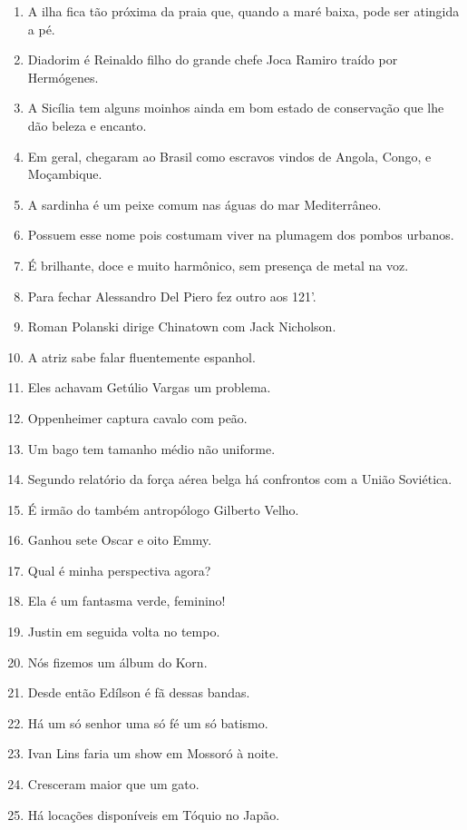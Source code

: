 \begin{enumerate}
\item A ilha fica t\~ao pr\'oxima da praia que, quando a mar\'e baixa, pode ser atingida a p\'e.
\item Diadorim \'e Reinaldo filho do grande chefe Joca Ramiro tra\'ido por Herm\'ogenes.
\item A Sic\'ilia tem alguns moinhos ainda em bom estado de conserva\c{c}\~ao que lhe d\~ao beleza e encanto.
\item Em geral, chegaram ao Brasil como escravos vindos de Angola, Congo, e Mo\c{c}ambique.
\item A sardinha \'e um peixe comum nas \'aguas do mar Mediterr\^aneo.
\item Possuem esse nome pois costumam viver na plumagem dos pombos urbanos.
\item \'E brilhante, doce e muito harm\^onico, sem presen\c{c}a de metal na voz.
\item Para fechar Alessandro Del Piero fez outro aos 121'.
\item Roman Polanski dirige Chinatown com Jack Nicholson.
\item A atriz sabe falar fluentemente espanhol.
\item Eles achavam Get\'ulio Vargas um problema.
\item Oppenheimer captura cavalo com pe\~ao.
\item Um bago tem tamanho m\'edio n\~ao uniforme.
\item Segundo relat\'orio da for\c{c}a a\'erea belga h\'a confrontos com a Uni\~ao Sovi\'etica.
\item \'E irm\~ao do tamb\'em antrop\'ologo Gilberto Velho.
\item Ganhou sete Oscar e oito Emmy.
\item Qual \'e minha perspectiva agora?
\item Ela \'e um fantasma verde, feminino!
\item Justin em seguida volta no tempo.
\item N\'os fizemos um \'album do Korn.
\item Desde ent\~ao Ed\'ilson \'e f\~a dessas bandas.
\item H\'a um s\'o senhor uma s\'o f\'e um s\'o batismo.
\item Ivan Lins faria um show em Mossor\'o \`a noite.
\item Cresceram maior que um gato.
\item H\'a loca\c{c}\~oes dispon\'iveis em T\'oquio no Jap\~ao.

\end{enumerate}
